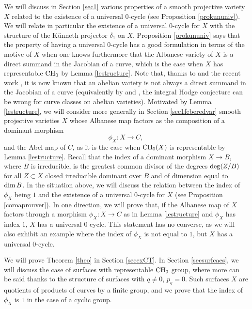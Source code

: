 \documentclass[10pt]{article}
\begin{document}
We will discuss in Section \ref{sec1} various properties of a smooth projective variety $X$ related to the existence of a universal $0$-cycle (see Proposition \ref{prokununiv}).
 We will relate in particular the existence of a universal $0$-cycle for $X$ with the structure of the K\"{u}nneth projector $\delta_1$ on $X$. Proposition \ref{prokununiv} says that the property of having a universal $0$-cycle has a good formulation in terms of  the motive of $X$ when one knows furthermore  that the Albanese variety of $X$ is a  direct summand in the Jacobian of a curve, which is the case when $X$ has representable ${\rm CH}_0$ by Lemma \ref{lestructure}. Note that, thanks to \cite{degaay} and the recent work \cite{SEggay}, it is now known that an abelian variety is not always a direct summand in the Jacobian of a curve (equivalently by \cite{degaay} and \cite{voisinArbarello},  the integral Hodge conjecture can be wrong for curve classes on abelian varieties).
Motivated by Lemma \ref{lestructure}, we will  consider more generally  in Section \ref{sec1feberedvar} smooth projective varieties $X$ whose Albanese map factors as the composition of a dominant  morphism
$$\phi_X:X\rightarrow C,$$
and the Abel map of $C$, as it is the case when ${\rm CH}_0(X)$ is representable  by Lemma \ref{lestructure}.
Recall that the index of a dominant morphism $X\rightarrow B$, where $B$ is irreducible, is the greatest common divisor of the degrees ${\rm deg}(Z/B)$ for all $Z\subset X$ closed irreducible dominant over $B$ and of dimension equal to ${\rm dim}\,B$. In the situation above, we will discuss the relation between the index of $\phi_X$ being $1$ and the existence of a universal $0$-cycle for $X$ (see Proposition \ref{coroaprouver}).
In one direction, we will prove  that, if the Albanese map of $X$  factors through a morphism
$ \phi_X:X\rightarrow C $ as in  Lemma \ref{lestructure} and $\phi_X$  has index $1$, $X$ has a universal $0$-cycle.
This statement has no converse, as
we will also exhibit an example where the index of $\phi_X$ is not equal to $1$, but $X$ has a universal $0$-cycle.

We will prove Theorem \ref{theo} in Section \ref{secexCT}. In Section \ref{secsurfcaes}, we will discuss the case of surfaces with representable ${\rm CH}_0$ group, where more can be said thanks to the structure of surfaces with $q\not=0$, $p_g=0$. Such surfaces $X$ are quotients of products of curves by a finite group, and we prove that the index of  $\phi_X$  is $1$ in the case of a cyclic group.

\vspace{0.5cm}
\end{document}
